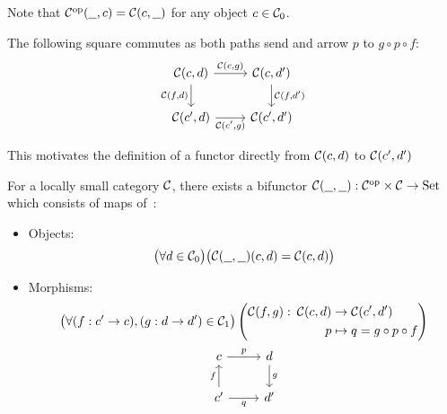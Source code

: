 \begin{remark}\label{rmk:op_hom_functor}
  Note that $\mathcal{C}^{\mathrm{op}}(\underline{\ \ }, c) = \mathcal{C}(c, \underline{\ \ })$ for any object $c\in\mathcal{C}_0$.
\end{remark}

\begin{remark}
  The following square commutes as both paths send and arrow $p$ to $g\circ
  p\circ f$:
  \[\begin{tikzcd}[ampersand replacement=\&]
    {\C(c,d)} \& {\C(c,d')} \\
    {\C(c', d)} \& {\C(c',d')}
    \arrow["{\C(c,g)}", from=1-1, to=1-2]
    \arrow["{\C(f,d)}"', from=1-1, to=2-1]
    \arrow["{\C(c', g)}"', from=2-1, to=2-2]
    \arrow["{\C(f,d')}", from=1-2, to=2-2]
  \end{tikzcd}\]

  This motivates the definition of a functor directly from $\mathcal{C}(c, d)$ to
  $\mathcal{C}(c',d')$
\end{remark}

\begin{definition}
  For a locally small category $\mathcal{C}$, there exists a bifunctor $\mathcal{C}(\underline{\ \ }, \underline{\ \ })
  : \mathcal{C}^{\mathrm{op}} \times \mathcal{C} \to \mathrm{Set}$ which consists of maps
  of~\parencite{leinster:basic_category_theory}:
  \begin{itemize}
    \item Objects:
      \[\big(\forall d \in \mathcal{C}_0\big)
        \big(\mathcal{C}(\underline{\ \ }, \underline{\ \ })(c,d) = \mathcal{C}(c, d)\big)\]
    \item Morphisms:
      \[
        \begin{gathered}
          \big(\forall (f:c'\to c),(g: d\to d')\in \C_1\big)
          \left(
            \begin{aligned}
              \C(f, g):&&\!\!\! \C(c, d) &\to \C(c', d')\\
              &&p &\mapsto q = g\circ p \circ f
            \end{aligned}
          \right)\\
          \begin{tikzcd}[ampersand replacement=\&]
            c \& d \\
            {c'} \& {d'}
            \arrow["f", from=2-1, to=1-1]
            \arrow["g", from=1-2, to=2-2]
            \arrow["p", from=1-1, to=1-2]
            \arrow["q"', from=2-1, to=2-2]
          \end{tikzcd}
        \end{gathered}
      \]
  \end{itemize}
\end{definition}